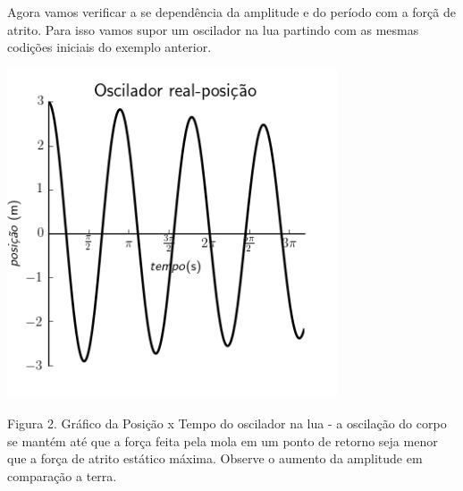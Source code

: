 \documentclass[a4paper]{article} %
\begin{document}
Agora vamos verificar a se depend\^encia da amplitude e do per\'iodo com a for\c{c}\~a de atrito. Para isso vamos supor um oscilador na lua partindo com as mesmas codi\c{c}\~oes iniciais do exemplo anterior.

\begin{center}
	\includegraphics[width=3.84in,height=3.84in,keepaspectratio = false]{image2_1.png}
	
	\scriptsize Figura 2. Gr\'afico da Posi\c{c}\~ao x Tempo do oscilador na lua - a oscila\c{c}\~ao do corpo se mant\'em at\'e que a for\c{c}a feita pela mola em um ponto de retorno seja menor que a for\c{c}a de atrito est\'atico m\'axima. Observe o aumento da amplitude em compara\c{c}\~ao a terra.
	
\end{center}
\end{document}
